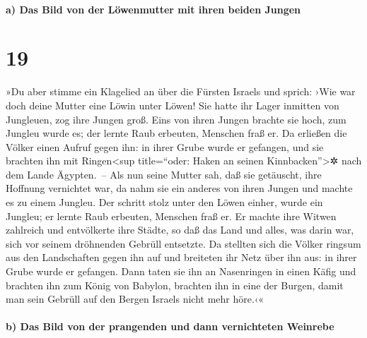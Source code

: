 \hypertarget{a-das-bild-von-der-luxf6wenmutter-mit-ihren-beiden-jungen}{%
\paragraph{a) Das Bild von der Löwenmutter mit ihren beiden
Jungen}\label{a-das-bild-von-der-luxf6wenmutter-mit-ihren-beiden-jungen}}

\hypertarget{section-18}{%
\section{19}\label{section-18}}

»Du aber stimme ein Klagelied an über die Fürsten Israels
und sprich: ›Wie war doch deine Mutter eine Löwin unter
Löwen! Sie hatte ihr Lager inmitten von Jungleuen, zog ihre Jungen groß.
Eins von ihren Jungen brachte sie hoch, zum Jungleu wurde
es; der lernte Raub erbeuten, Menschen fraß er. Da
erließen die Völker einen Aufruf gegen ihn: in ihrer Grube wurde er
gefangen, und sie brachten ihn mit Ringen\textless sup title=``oder:
Haken an seinen Kinnbacken''\textgreater✲ nach dem Lande Ägypten.~--
Als nun seine Mutter sah, daß sie getäuscht, ihre Hoffnung
vernichtet war, da nahm sie ein anderes von ihren Jungen und machte es
zu einem Jungleu. Der schritt stolz unter den Löwen
einher, wurde ein Jungleu; er lernte Raub erbeuten, Menschen fraß er.
Er machte ihre Witwen zahlreich und entvölkerte ihre
Städte, so daß das Land und alles, was darin war, sich vor seinem
dröhnenden Gebrüll entsetzte. Da stellten sich die Völker
ringsum aus den Landschaften gegen ihn auf und breiteten ihr Netz über
ihn aus: in ihrer Grube wurde er gefangen. Dann taten sie
ihn an Nasenringen in einen Käfig und brachten ihn zum König von
Babylon, brachten ihn in eine der Burgen, damit man sein Gebrüll auf den
Bergen Israels nicht mehr höre.‹«

\hypertarget{b-das-bild-von-der-prangenden-und-dann-vernichteten-weinrebe}{%
\paragraph{b) Das Bild von der prangenden und dann vernichteten
Weinrebe}\label{b-das-bild-von-der-prangenden-und-dann-vernichteten-weinrebe}}


